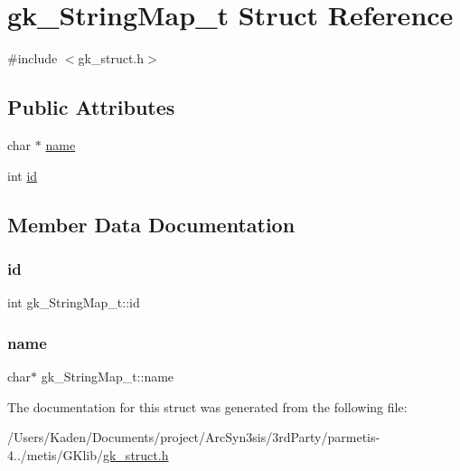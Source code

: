 \hypertarget{a00646}{}\section{gk\+\_\+\+String\+Map\+\_\+t Struct Reference}
\label{a00646}


{\ttfamily \#include $<$gk\+\_\+struct.\+h$>$}

\subsection*{Public Attributes}
\begin{DoxyCompactItemize}
\item 
char $\ast$ \hyperlink{a00646_a22d4edf70d41af7c5ed2db52ee09eb99}{name}
\item 
int \hyperlink{a00646_a167db63a424bbf4d1709685edd191c3a}{id}
\end{DoxyCompactItemize}


\subsection{Member Data Documentation}
\mbox{\label{a00646_a167db63a424bbf4d1709685edd191c3a}} 
\subsubsection{\texorpdfstring{id}{id}}
{\footnotesize\ttfamily int gk\+\_\+\+String\+Map\+\_\+t\+::id}

\mbox{\label{a00646_a22d4edf70d41af7c5ed2db52ee09eb99}} 
\subsubsection{\texorpdfstring{name}{name}}
{\footnotesize\ttfamily char$\ast$ gk\+\_\+\+String\+Map\+\_\+t\+::name}



The documentation for this struct was generated from the following file\+:\begin{DoxyCompactItemize}
\item 
/\+Users/\+Kaden/\+Documents/project/\+Arc\+Syn3sis/3rd\+Party/parmetis-\/4../metis/\+G\+Klib/\hyperlink{a00080}{gk\+\_\+struct.\+h}\end{DoxyCompactItemize}
